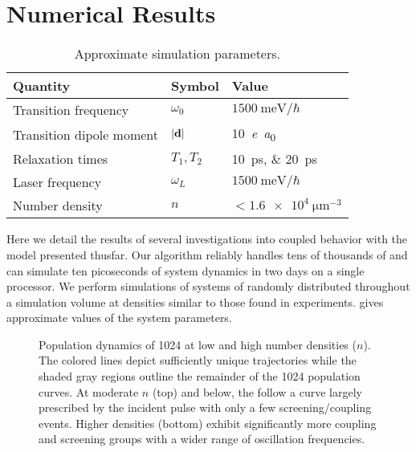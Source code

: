 \section{Numerical Results}
\begin{table}
  \begin{ruledtabular}
    \begin{tabular}{lll}
      Quantity                 & Symbol         & Value                        \\ \hline
      Transition frequency     & $\omega_0$     & $\SI{1500}{\milli\eV}/\hbar$ \\
      Transition dipole moment & $\abs{\vb{d}}$ & \SI{10}{\elementarycharge\bohr} \\
      Relaxation times         & $T_{1}, T_{2}$ & \SIlist{10;20}{\pico\second} \\
      Laser frequency          & $\omega_L$     & $\SI{1500}{\milli\eV}/\hbar$ \\
      Number density           & $n$            & $< \SI{1.6e4}{\micro\meter\tothe{-3}}$ \\
    \end{tabular}
  \end{ruledtabular}
  \caption{\label{table:parameters}Approximate simulation parameters.}
\end{table}

Here we detail the results of several investigations into coupled \qd{} behavior with the model presented thusfar.
Our algorithm reliably handles tens of thousands of \qds{} and can simulate ten picoseconds of system dynamics in two days on a single processor.
We perform simulations of systems of \qds{} randomly distributed throughout a simulation volume at densities similar to those found in experiments.
 gives approximate values of the system parameters.

\begin{figure}
  
  \caption{\label{fig:density stats}Population dynamics of 1024 \qds{} at low and high number densities ($n$).
  The colored lines depict sufficiently unique trajectories while the shaded gray regions outline the remainder of the 1024 population curves.
  At moderate $n$ (top) and below, the \qds{} follow a curve largely prescribed by the incident pulse with only a few screening/coupling events.
  Higher densities (bottom) exhibit significantly more coupling and screening groups with a wider range of oscillation frequencies.
}
\end{figure}

